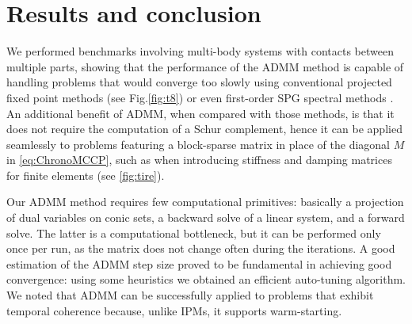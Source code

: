 \documentclass{svproc}
\begin{document}
\section{Results and conclusion}

We performed benchmarks involving multi-body systems with contacts between multiple parts, showing that the performance of the ADMM method is capable of handling problems that would converge too slowly using conventional projected fixed point methods (see Fig.\ref{fig:t8}) or even first-order SPG spectral methods \cite{heynIJNME2013}.
An additional benefit of ADMM, when compared with those methods, is that it does not require the computation of a Schur complement, hence it can be applied seamlessly to problems featuring a block-sparse matrix in place of the diagonal $M$ in \eqref{eq:ChronoMCCP}, such as when introducing stiffness and damping matrices for finite elements (see \ref{fig:tire}).

Our ADMM method requires few computational primitives: basically a projection of dual variables on conic sets, a backward solve of a linear system, and a forward solve. The latter is a computational bottleneck, but it can be performed only once per run, as the matrix does not change often during the iterations. 
A good estimation of the ADMM step size proved to be fundamental in achieving good convergence: using some heuristics we obtained an efficient auto-tuning algorithm. 
We noted that ADMM can be successfully applied to problems that exhibit temporal coherence because, unlike IPMs, it supports warm-starting.




\end{document}
